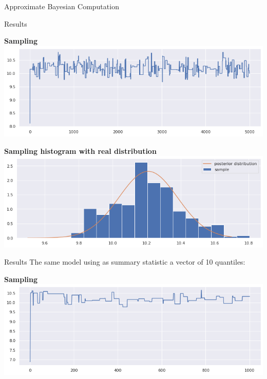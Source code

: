 \documentclass{beamer}
\begin{document}
\begin{section}{Approximate Bayesian Computation}
\begin{frame}{Results}
\begin{center}
\begin{minipage}{0.63\textwidth}
\begin{center}
	{\scriptsize \textbf{Sampling}}
	\includegraphics[width=\textwidth]{ABC_graphs/ABCiterations}
\end{center}
\end{minipage}

\vspace{0.2cm}

\begin{minipage}{0.63\textwidth}
\begin{center}
	{\scriptsize \textbf{Sampling histogram with real distribution}}
	\includegraphics[width=\textwidth]{ABC_graphs/ABCunivgraphic}
\end{center}
\end{minipage}
\end{center}
\end{frame}


\begin{frame}{Results}
The same model using as summary statistic a vector of 10 quantiles:
\begin{center}
	\begin{minipage}{0.63\textwidth}
		\begin{center}
			{\scriptsize \textbf{Sampling}}
			\includegraphics[width=\textwidth]{ABC_graphs/ABC_S1_1000iter}
		\end{center}
	\end{minipage}
	

\end{center}
\end{frame}
\end{section}
\end{document}
